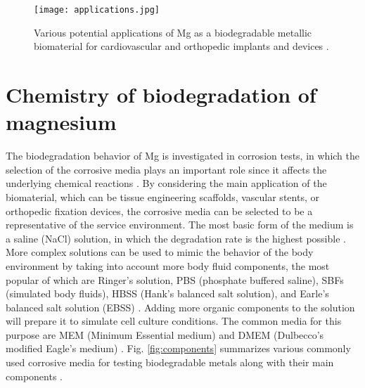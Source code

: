 \begin{figure}
\centering
\medskip
\texttt{[image: applications.jpg]}
\caption[Various potential applications of Mg as a biodegradable biomaterial]{Various potential applications of Mg as a biodegradable metallic biomaterial for cardiovascular and orthopedic implants and devices \cite{Han2019}.} 
\label{fig:intro_applications}
\end{figure}


\section{Chemistry of biodegradation of magnesium}


The biodegradation behavior of Mg is investigated in corrosion tests, in which the selection of the corrosive media plays an important role since it affects the underlying chemical reactions \cite{Mei2020}. By considering the main application of the biomaterial, which can be tissue engineering scaffolds, vascular stents, or orthopedic fixation devices, the corrosive media can be selected to be a representative of the service environment. The most basic form of the medium is a saline (NaCl) solution, in which the degradation rate is the highest possible \cite{Mei2020}. More complex solutions can be used to mimic the behavior of the body environment by taking into account more body fluid components, the most popular of which are Ringer's solution, \gls{PBS} (phosphate buffered saline), \gls{SBF}s (simulated body fluids), \gls{HBSS} (Hank's balanced salt solution), and Earle's balanced salt solution (\gls{EBSS}) \cite{Mei2020}. Adding more organic components to the solution will prepare it to simulate cell culture conditions. The common media for this purpose are \gls{MEM} (Minimum Essential medium) and \gls{DMEM} (Dulbecco's modified Eagle's medium) \cite{Mei2020}. Fig. \ref{fig:components} summarizes various commonly used corrosive media for testing biodegradable metals along with their main components  \cite{Mei2020}.


